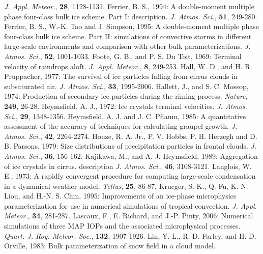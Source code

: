       {\it J. Appl. Meteor.},
      {\bf 28},
      1128-1131.
\decrefname
Ferrier, B. S., 1994:
      A double-moment multiple phase four-class bulk ice scheme. Part I:
      description.
      {\it J. Atmos. Sci.},
      {\bf 51},
      249-280.
\decrefname
Ferrier, B. S., W.-K. Tao and J. Simpson, 1995:
      A double-moment multiple phase four-class bulk ice scheme. Part II:
      simulations of convective storms in different large-scale environments and
      comparison with other bulk parameterizations.
      {\it J. Atmos. Sci.},
      {\bf 52},
      1001-1033.
\decrefname
Foote, G. B., and P. S. Du Toit, 1969:
      Terminal velocity of raindrops aloft.
      {\it J. Appl. Meteor.},
      {\bf 8},
      249-253.
\decrefname
Hall, W. D., and H. R. Pruppacher, 1977:
      The survival of ice particles falling from cirrus clouds in subsaturated
      air.
      {\it J. Atmos. Sci.},
      {\bf 33},
      1995-2006.
\decrefname
Hallett, J., and S. C. Mossop, 1974:
      Production of secondary ice particles during the riming process.
      {\it Nature},
      {\bf 249},
      26-28.
\decrefname
Heymsfield, A. J., 1972:
      Ice crystals terminal velocities.
      {\it J. Atmos. Sci.},
      {\bf 29},
      1348-1356.
\decrefname
Heymsfield, A. J. and J. C. Pflaum, 1985:
      A quantitative assessment of the accuracy of techniques for calculating
      graupel growth.
      {\it J. Atmos. Sci.},
      {\bf 42},
      2264-2274.
\decrefname
Houze, R. A. Jr., P. V. Hobbs, P. H. Herzegh and D. B. Parsons, 1979:
      Size distributions of precipitation particles in frontal clouds.
      {\it J. Atmos. Sci.},
      {\bf 36},
      156-162.
\decrefname
Kajikawa, M., and A. J. Heymsfield, 1989:
      Aggregation of ice crystals in cirrus.
      description
      {\it J. Atmos. Sci.},
      {\bf 46},
      3108-3121.
\decrefname
Langlois, W. E., 1973:
      A rapidly convergent procedure for computing large-scale condensation in
      a dynamical weather model.
      {\it Tellus},
      {\bf 25},
      86-87.
\decrefname
Krueger, S. K., Q. Fu, K. N. Liou, and H.-N. S. Chin, 1995:
      Improvements of an ice-phase microphysics parameterization for use in
      numerical simulations of tropical convection.
      {\it J. Appl. Meteor.},
      {\bf 34},
      281-287.
\decrefname
Lascaux, F., E. Richard, and J.-P. Pinty, 2006:
      Numerical simulations of three MAP IOPs and the associated microphysical processes.
     {\it Quart. J. Roy. Meteor. Soc.}, {\bf 132}, 1907-1926.
\decrefname
Lin, Y.-L., R. D. Farley, and H. D. Orville, 1983:
      Bulk parameterization of snow field in a cloud model.
